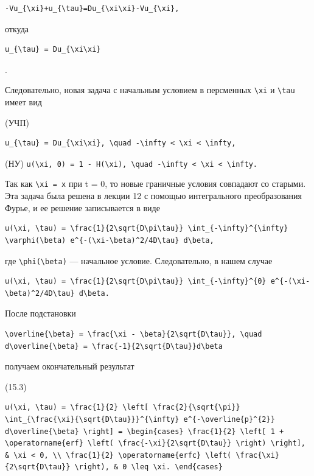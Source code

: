 \documentclass[
  ukrainian,
]{article}
\begin{document}
\begin{verbatim}
-Vu_{\xi}+u_{\tau}=Du_{\xi\xi}-Vu_{\xi},
\end{verbatim}

откуда

\begin{verbatim}
u_{\tau} = Du_{\xi\xi}
\end{verbatim}

.

Следовательно, новая задача с начальным условием в персменных
\texttt{\textbackslash{}xi} и \texttt{\textbackslash{}tau} имеет вид

(УЧП)

\begin{verbatim}
u_{\tau} = Du_{\xi\xi}, \quad -\infty < \xi < \infty,
\end{verbatim}

(НУ)
\texttt{u(\textbackslash{}xi,\ 0)\ =\ 1\ -\ H(\textbackslash{}xi),\ \textbackslash{}quad\ -\textbackslash{}infty\ \textless{}\ \textbackslash{}xi\ \textless{}\ \textbackslash{}infty.}

Так как \texttt{\textbackslash{}xi\ =\ x} при t = 0, то новые граничные
условия совпадают со старыми. Эта задача была решена в лекции 12 с
помощью интегрального преобразования Фурье, и ее решение записывается в
виде

\begin{verbatim}
u(\xi, \tau) = \frac{1}{2\sqrt{D\pi\tau}} \int_{-\infty}^{\infty} \varphi(\beta) e^{-(\xi-\beta)^2/4D\tau} d\beta,
\end{verbatim}

где \texttt{\textbackslash{}phi(\textbackslash{}beta)} --- начальное
условие. Следовательно, в нашем случае

\begin{verbatim}
u(\xi, \tau) = \frac{1}{2\sqrt{D\pi\tau}} \int_{-\infty}^{0} e^{-(\xi-\beta)^2/4D\tau} d\beta.
\end{verbatim}

После подстановки

\begin{verbatim}
\overline{\beta} = \frac{\xi - \beta}{2\sqrt{D\tau}}, \quad d\overline{\beta} = \frac{-1}{2\sqrt{D\tau}}d\beta
\end{verbatim}

получаем окончательный результат

(15.3)

\begin{verbatim}
u(\xi, \tau) = \frac{1}{2} \left[ \frac{2}{\sqrt{\pi}} \int_{\frac{\xi}{\sqrt{D\tau}}}^{\infty} e^{-\overline{p}^{2}} d\overline{\beta} \right] = \begin{cases} \frac{1}{2} \left[ 1 + \operatorname{erf} \left( \frac{-\xi}{2\sqrt{D\tau}} \right) \right], & \xi < 0, \\ \frac{1}{2} \operatorname{erfc} \left( \frac{\xi}{2\sqrt{D\tau}} \right), & 0 \leq \xi. \end{cases}
\end{verbatim}
\end{document}
